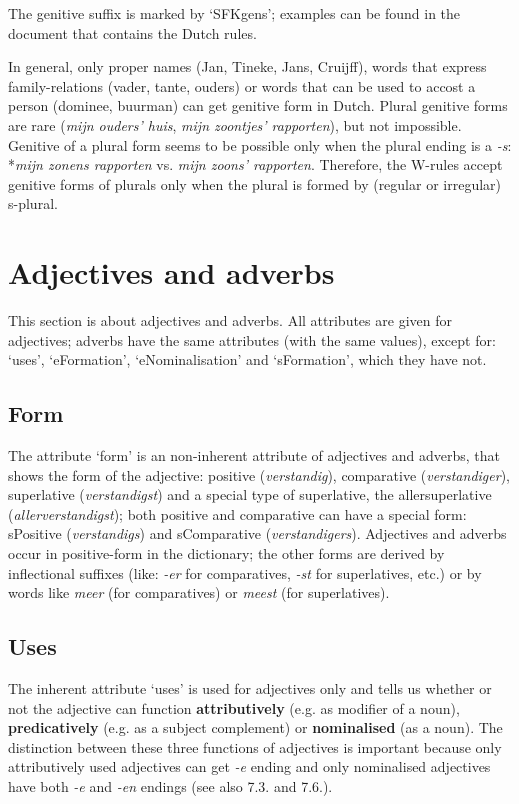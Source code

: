 The genitive suffix is marked by `SFKgens'; examples can be found in the 
document that contains the Dutch rules.

In general, only proper names (Jan, Tineke, Jans, Cruijff), words that 
express family-relations (vader, tante, ouders) or words that can be used to 
accost a person (dominee, buurman) can get genitive form in Dutch. Plural
genitive forms are rare ({\em mijn ouders' huis}, 
{\em mijn zoontjes' rapporten}),
but not impossible. Genitive of a plural form seems to be possible only when the
plural ending is a {\em -s}: *{\em mijn zonens rapporten} vs. 
{\em mijn zoons' rapporten}.
Therefore, the W-rules accept genitive forms of plurals only when the
plural is formed by (regular or irregular) s-plural.


\newpage
\section{Adjectives and adverbs}

This section is about adjectives and adverbs. All attributes are given for
adjectives; adverbs have the same attributes (with the same values), except for:
`uses', `eFormation', `eNominalisation' and `sFormation', which they have not.

\subsection{Form}

The attribute `form' is an non-inherent attribute of adjectives and adverbs,
that shows the form of the adjective: positive ({\em verstandig}), comparative
({\em verstandiger}), superlative ({\em verstandigst}) and a special type 
of superlative, the allersuperlative ({\em allerverstandigst}); both positive
and comparative can have a special form: sPositive ({\em verstandigs}) and 
sComparative ({\em verstandigers}). Adjectives and
adverbs occur in positive-form in the dictionary; the other forms are derived
by inflectional suffixes (like: {\em -er} for comparatives, {\em -st} for 
superlatives, 
etc.) or by words like {\em meer} (for comparatives) or {\em meest} (for 
superlatives).


\subsection{Uses}

The inherent attribute `uses' is used for adjectives only and tells us whether 
or not the adjective can function {\bf attributively} (e.g. as modifier of a 
noun), {\bf predicatively} (e.g. as a subject complement) or 
{\bf nominalised} (as a noun). The distinction between these three
functions of adjectives is important because only attributively used adjectives
can get {\em -e} ending and only nominalised adjectives have both {\em -e} and 
{\em -en} 
endings (see also 7.3. and 7.6.).

